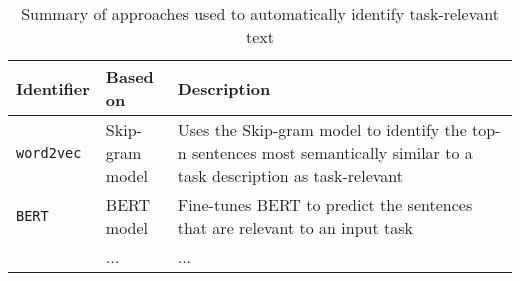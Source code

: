 
\begin{table}[H]
\centering    
\begin{scriptsize}
\begin{threeparttable}
\begin{tabular}{lll}





\textbf{Identifier} & \textbf{Based on} & \textbf{Description} \\

\hline




\texttt{word2vec} & 
\parbox[l][1cm][c] {1.5cm}{Skip-gram\\model} &
\parbox[l][1cm][c] {8.5cm}{
    Uses the Skip-gram model to identify the top-n sentences most semantically similar to a task description as task-relevant
}
\\

\texttt{BERT} & 
\parbox[l][1cm][c] {1.5cm}{BERT\\model} &
\parbox[l][1cm][c] {8.5cm}{
    Fine-tunes BERT to predict the sentences that are relevant to an input task
}
\\


\texttt{} & 
\parbox[l][0.5cm][c] {1.5cm}{ ... } &
\parbox[l][0.5cm][c] {8.5cm}{ ... }
\\




\hline


\end{tabular}
\end{threeparttable}
\end{scriptsize}
\caption{Summary of approaches used to automatically identify task-relevant text}
\label{tbl:approaches-summary}
\end{table}

